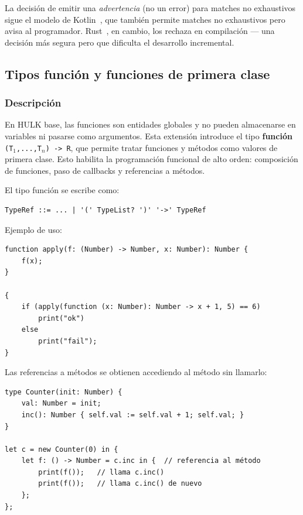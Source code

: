 \documentclass[12pt, a4paper]{article}
\begin{document}
La decisión de emitir una \textit{advertencia} (no un error) para matches
no exhaustivos sigue el modelo de Kotlin~\cite{jemerov2017}, que también permite matches
no exhaustivos pero avisa al programador. Rust~\cite{klabnik2019}, en cambio, los rechaza
en compilación — una decisión más segura pero que dificulta el desarrollo
incremental.

\subsection{Tipos función y funciones de primera clase}

\subsubsection{Descripción}

En HULK base, las funciones son entidades globales y no pueden almacenarse en
variables ni pasarse como argumentos. Esta extensión introduce el tipo
\textbf{función} \texttt{(T$_1$,...,T$_n$) -> R}, que permite tratar funciones
y métodos como valores de primera clase. Esto habilita la programación funcional
de alto orden: composición de funciones, paso de callbacks y referencias a métodos.

El tipo función se escribe como:

\begin{lstlisting}[language={},caption={Sintaxis del tipo función},
                   label=lst:functype-bnf]
TypeRef ::= ... | '(' TypeList? ')' '->' TypeRef
\end{lstlisting}

Ejemplo de uso:

\begin{lstlisting}[caption={Función de alto orden con tipo función},
                   label=lst:functype-ex]
function apply(f: (Number) -> Number, x: Number): Number {
    f(x);
}

{
    if (apply(function (x: Number): Number -> x + 1, 5) == 6)
        print("ok")
    else
        print("fail");
}
\end{lstlisting}

Las referencias a métodos se obtienen accediendo al método sin llamarlo:

\begin{lstlisting}[caption={Referencia a método como valor},
                   label=lst:methodref]
type Counter(init: Number) {
    val: Number = init;
    inc(): Number { self.val := self.val + 1; self.val; }
}

let c = new Counter(0) in {
    let f: () -> Number = c.inc in {  // referencia al método
        print(f());   // llama c.inc()
        print(f());   // llama c.inc() de nuevo
    };
};
\end{lstlisting}
\end{document}
